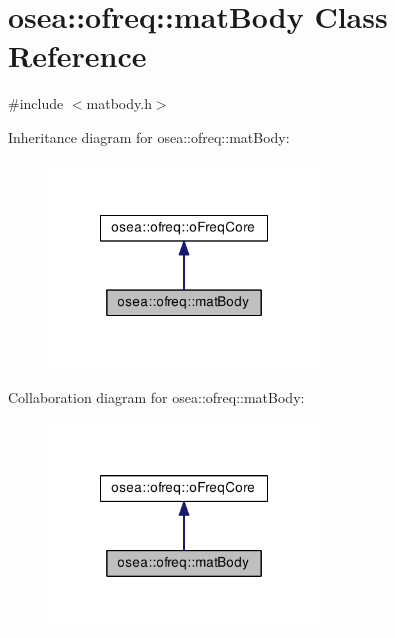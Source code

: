 \hypertarget{classosea_1_1ofreq_1_1mat_body}{\section{osea\-:\-:ofreq\-:\-:mat\-Body Class Reference}
\label{classosea_1_1ofreq_1_1mat_body}
}


{\ttfamily \#include $<$matbody.\-h$>$}



Inheritance diagram for osea\-:\-:ofreq\-:\-:mat\-Body\-:\nopagebreak
\begin{figure}[H]
\begin{center}
\leavevmode
\includegraphics[width=204pt]{classosea_1_1ofreq_1_1mat_body__inherit__graph}
\end{center}
\end{figure}


Collaboration diagram for osea\-:\-:ofreq\-:\-:mat\-Body\-:\nopagebreak
\begin{figure}[H]
\begin{center}
\leavevmode
\includegraphics[width=204pt]{classosea_1_1ofreq_1_1mat_body__coll__graph}
\end{center}
\end{figure}
